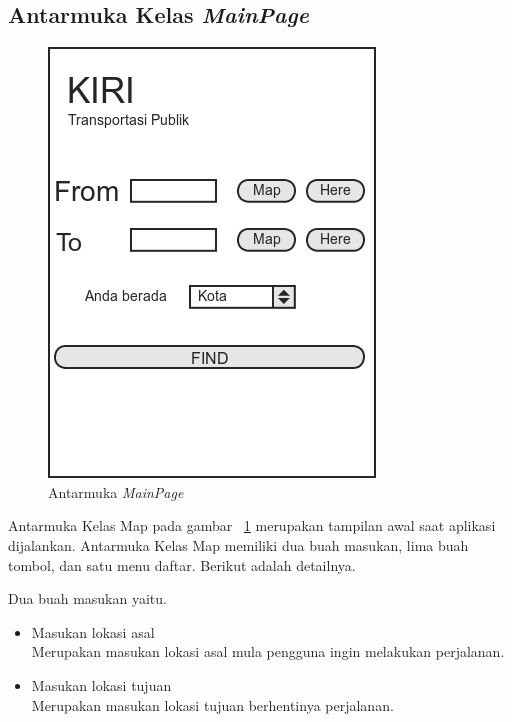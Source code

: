 \subsection{Antarmuka Kelas \textit{MainPage}}
\label{lab:Antarmuka Kelas MainPage}

\begin{figure}[h]
	\centering
		\includegraphics[scale=0.6]{Gambar/perancangan_antarmuka/Home}
	\caption{Antarmuka \textit{MainPage}}
	\label{fig:Antarmuka MainPage}
\end{figure}

\hspace{0.5cm} Antarmuka Kelas Map pada gambar ~\ref{fig:Antarmuka MainPage} merupakan tampilan awal saat aplikasi dijalankan. Antarmuka Kelas Map memiliki dua buah masukan, lima buah tombol, dan satu menu daftar. Berikut adalah detailnya.

Dua buah masukan yaitu.
\begin{itemize}
	\item Masukan lokasi asal\\
	Merupakan masukan lokasi asal mula pengguna ingin melakukan perjalanan.
	\item Masukan lokasi tujuan\\
	Merupakan masukan lokasi tujuan berhentinya perjalanan.
\end{itemize}

